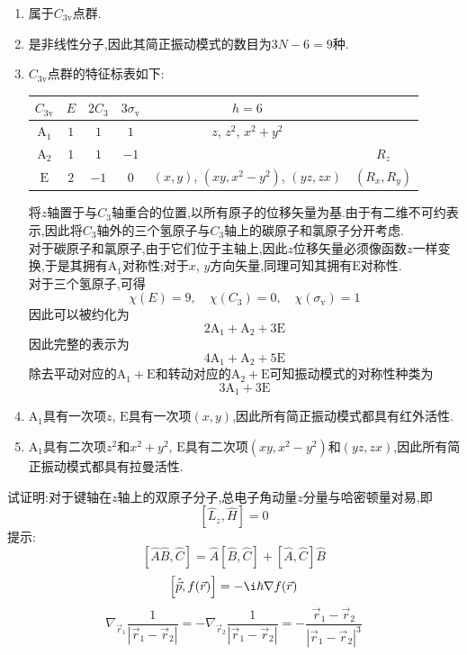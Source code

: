 \documentclass{ctexart}
\begin{document}
\begin{solution}
\begin{enumerate}[label=\tbf{(\alph*)}]
    \item 属于$C_{3\text{v}}$点群.
    \item {}是非线性分子,因此其简正振动模式的数目为$3N-6=9$种.
    \item $C_{3\text{v}}$点群的特征标表如下:
    \begin{table}[H]\centering
    \begin{tabular}{cccccc}\hline
        $C_{3\text{v}}$ & $E$ & $2C_3$ & $3\sigma_{\text{v}}$ & $h=6$ & \\\hline
        $\text{A}_1$ & $1$ & $1$ & $1$ & $z$, $z^2$, $x^2+y^2$ & \\\hline
        $\text{A}_2$ & $1$ & $1$ & $-1$ & & $R_z$\\\hline
        $\text{E}$ & $2$ & $-1$ & $0$ & $(x,y)$, $(xy,x^2-y^2)$, $(yz,zx)$ & $(R_x,R_y)$ \\\hline
    \end{tabular}
    \end{table}
    将$z$轴置于与$C_3$轴重合的位置,以所有原子的位移矢量为基.由于有二维不可约表示,因此将$C_3$轴外的三个氢原子与$C_3$轴上的碳原子和氯原子分开考虑.\\
    对于碳原子和氯原子,由于它们位于主轴上,因此$z$位移矢量必须像函数$z$一样变换,于是其拥有$\text{A}_1$对称性;对于$x$, $y$方向矢量,同理可知其拥有$\text{E}$对称性.\\
    对于三个氢原子,可得
    \[\chi(E)=9,\quad\chi(C_3)=0,\quad\chi(\sigma_{\text{v}})=1\]
    因此可以被约化为
    \[2\text{A}_1+\text{A}_2+3\text{E}\]
    因此完整的表示为
    \[4\text{A}_1+\text{A}_2+5\text{E}\]
    除去平动对应的$\text{A}_1+\text{E}$和转动对应的$\text{A}_2+\text{E}$可知振动模式的对称性种类为
    \[3\text{A}_1+3\text{E}\]
    \item $\text{A}_1$具有一次项$z$, $\text{E}$具有一次项$(x,y)$,因此所有简正振动模式都具有红外活性.
    \item $\text{A}_1$具有二次项$z^2$和$x^2+y^2$, $\text{E}$具有二次项$(xy,x^2-y^2)$和$(yz,zx)$,因此所有简正振动模式都具有拉曼活性.
\end{enumerate}
\end{solution}
\begin{homework}[10.]
    试证明:对于键轴在$z$轴上的双原子分子,总电子角动量$z$分量与哈密顿量对易,即
    \[\left[\hat{L}_z,\hat{H}\right]=0\]
    提示:
    \[\left[\hat{A}\hat{B},\hat{C}\right]=\hat{A}\left[\hat{B},\hat{C}\right]+\left[\hat{A},\hat{C}\right]\hat{B}\]
    \[\left[\hat{\vec{p}},f(\vec{r})\right]=-\i\hbar\nabla f(\vec{r})\]
    \[\nabla_{\vec{r}_1}\dfrac{1}{\left|\vec{r}_1-\vec{r}_2\right|}=-\nabla_{\vec{r}_2}\dfrac{1}{\left|\vec{r}_1-\vec{r}_2\right|}=-\dfrac{\vec{r}_1-\vec{r}_2}{\left|\vec{r}_1-\vec{r}_2\right|^3}\]
\end{homework}
\end{document}
